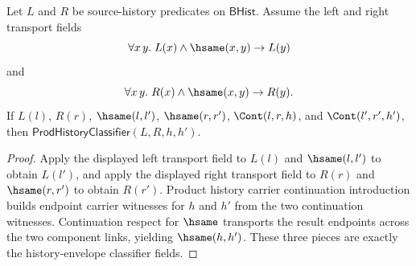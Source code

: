 \begin{theorem}
\label{thm:prod-history-classifier-cont-congr}
Let $L$ and $R$ be source-history predicates on $\mathsf{BHist}$. Assume the left and right transport fields
$$
\forall x\,y.\; L(x)\land\hsame(x,y)\to L(y)
$$
and
$$
\forall x\,y.\; R(x)\land\hsame(x,y)\to R(y).
$$
If $L(l)$, $R(r)$, $\hsame(l,l')$, $\hsame(r,r')$, $\Cont(l,r,h)$, and $\Cont(l',r',h')$, then
$\mathsf{ProdHistoryClassifier}(L,R,h,h')$.
\end{theorem}
\begin{proof}
Apply the displayed left transport field to $L(l)$ and $\hsame(l,l')$ to obtain $L(l')$, and apply the displayed right transport field to $R(r)$ and $\hsame(r,r')$ to obtain $R(r')$. Product history carrier continuation introduction builds endpoint carrier witnesses for $h$ and $h'$ from the two continuation witnesses. Continuation respect for $\hsame$ transports the result endpoints across the two component links, yielding $\hsame(h,h')$. These three pieces are exactly the history-envelope classifier fields.
\end{proof}

